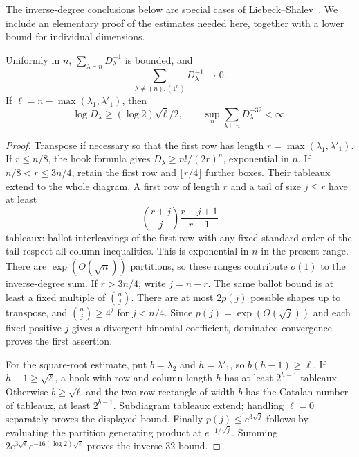 The inverse-degree conclusions below are special cases of
Liebeck--Shalev~\cite[Proposition 2.5 and Theorem 2.6]{liebeck-shalev2004}.
We include an elementary proof of the estimates needed here, together
with a lower bound for individual dimensions.
\begin{lemma}\label{lem:degrees}
Uniformly in $n$, $\sum_{\lambda\vdash n}D_\lambda^{-1}$ is bounded, and
\[
 \sum_{\lambda\ne(n),(1^n)}D_\lambda^{-1}\longrightarrow0.
\]
If $\ell=n-\max(\lambda_1,\lambda'_1)$, then
\[
 \log D_\lambda\ge(\log2)\sqrt\ell/2,
 \qquad \sup_n\sum_{\lambda\vdash n}D_\lambda^{-32}<\infty.
\]
\end{lemma}
\begin{proof}
Transpose if necessary so that the first row has length $r=\max(\lambda_1,\lambda'_1)$. If $r\le n/8$, the hook formula gives $D_\lambda\ge n!/(2r)^n$, exponential in $n$. If $n/8<r\le3n/4$, retain the first row and $\lfloor r/4\rfloor$ further boxes. Their tableaux extend to the whole diagram. A first row of length $r$ and a tail of size $j\le r$ have at least
\[
 \binom{r+j}{j}\frac{r-j+1}{r+1}
\]
tableaux: ballot interleavings of the first row with any fixed standard order of the tail respect all column inequalities. This is exponential in $n$ in the present range. There are $\exp(O(\sqrt n))$ partitions, so these ranges contribute $o(1)$ to the inverse-degree sum. If $r>3n/4$, write $j=n-r$. The same ballot bound is at least a fixed multiple of $\binom nj$. There are at most $2p(j)$ possible shapes up to transpose, and $\binom nj\ge4^j$ for $j<n/4$. Since $p(j)=\exp(O(\sqrt j))$ and each fixed positive $j$ gives a divergent binomial coefficient, dominated convergence proves the first assertion.

For the square-root estimate, put $b=\lambda_2$ and $h=\lambda'_1$, so $b(h-1)\ge\ell$. If $h-1\ge\sqrt\ell$, a hook with row and column length $h$ has at least $2^{h-1}$ tableaux. Otherwise $b\ge\sqrt\ell$ and the two-row rectangle of width $b$ has the Catalan number of tableaux, at least $2^{b-1}$. Subdiagram tableaux extend; handling $\ell=0$ separately proves the displayed bound. Finally $p(j)\le e^{3\sqrt j}$ follows by evaluating the partition generating product at $e^{-1/\sqrt j}$. Summing $2e^{3\sqrt\ell}e^{-16(\log2)\sqrt\ell}$ proves the inverse-32 bound.
\end{proof}
